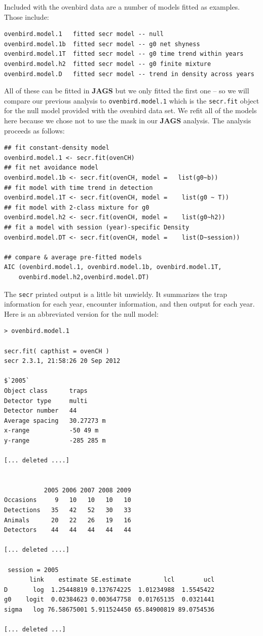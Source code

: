 Included with the ovenbird data are a number of  models fitted as
examples. Those include:
\begin{verbatim}
ovenbird.model.1   fitted secr model -- null
ovenbird.model.1b  fitted secr model -- g0 net shyness
ovenbird.model.1T  fitted secr model -- g0 time trend within years
ovenbird.model.h2  fitted secr model -- g0 finite mixture
ovenbird.model.D   fitted secr model -- trend in density across years
\end{verbatim}
All of these can be fitted in {\bf JAGS} but 
we only fitted the first one -- so we will compare our previous analysis to {\tt ovenbird.model.1} which is the \mbox{\tt secr.fit}
object for the null model provided with the ovenbird data set. We
refit all of the models here because we chose not to use the mask in
our {\bf JAGS} analysis. 
The analysis proceeds as follows:
{\small 
\begin{verbatim}
## fit constant-density model
ovenbird.model.1 <- secr.fit(ovenCH)
## fit net avoidance model
ovenbird.model.1b <- secr.fit(ovenCH, model =   list(g0~b))
## fit model with time trend in detection
ovenbird.model.1T <- secr.fit(ovenCH, model =    list(g0 ~ T))
## fit model with 2-class mixture for g0
ovenbird.model.h2 <- secr.fit(ovenCH, model =    list(g0~h2))
## fit a model with session (year)-specific Density
ovenbird.model.DT <- secr.fit(ovenCH, model =    list(D~session))

## compare & average pre-fitted models
AIC (ovenbird.model.1, ovenbird.model.1b, ovenbird.model.1T,
    ovenbird.model.h2,ovenbird.model.DT)
\end{verbatim}
}
The \mbox{\tt secr} printed output is a little bit unwieldy. It summarizes the trap
information for each year, encounter information, and then output for
each year. Here is an abbreviated version for the null model:
{\small
\begin{verbatim}
> ovenbird.model.1

secr.fit( capthist = ovenCH )
secr 2.3.1, 21:58:26 20 Sep 2012

$`2005`
Object class      traps 
Detector type     multi 
Detector number   44 
Average spacing   30.27273 m 
x-range           -50 49 m 
y-range           -285 285 m 

[... deleted ....]


           2005 2006 2007 2008 2009
Occasions     9   10   10   10   10
Detections   35   42   52   30   33
Animals      20   22   26   19   16
Detectors    44   44   44   44   44

[... deleted ....]

 session = 2005 
       link    estimate SE.estimate         lcl        ucl
D       log  1.25448819 0.137674225  1.01234988  1.5545422
g0    logit  0.02384623 0.003647758  0.01765135  0.0321441
sigma   log 76.58675001 5.911524450 65.84900819 89.0754536

[... deleted ...]
\end{verbatim}
}

